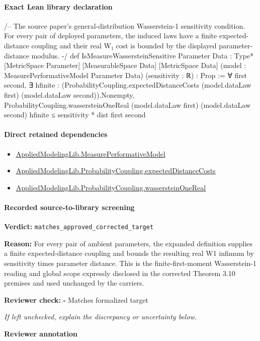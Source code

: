\documentclass[10pt]{article}
\newcommand{\reviewerbox}{%
  \par\noindent\fbox{\parbox{0.96\linewidth}{\rule{0pt}{0.38in}}}\par
}
\newcommand{\reviewmatch}[1]{%
  \par\noindent\textbf{Reviewer check:} $\square$\; #1\par
  \noindent\emph{If left unchecked, explain the discrepancy or uncertainty below.}\par
}
\begin{document}
\paragraph{Exact Lean library declaration}
\begin{ReviewVerbatim}
/--
The source paper's general-distribution Wasserstein-1 sensitivity condition.
For every pair of deployed parameters, the induced laws have a finite
expected-distance coupling and their real W₁ cost is bounded by the displayed
parameter-distance modulus.
-/
def IsMeasureWassersteinSensitive {Parameter Data : Type*}
    [MetricSpace Parameter] [MeasurableSpace Data] [MetricSpace Data]
    (model : MeasurePerformativeModel Parameter Data) (sensitivity : ℝ) : Prop :=
  ∀ first second,
    ∃ hfinite : (ProbabilityCoupling.expectedDistanceCosts
      (model.dataLaw first) (model.dataLaw second)).Nonempty,
      ProbabilityCoupling.wassersteinOneReal (model.dataLaw first) (model.dataLaw second) hfinite ≤
        sensitivity * dist first second
\end{ReviewVerbatim}

\paragraph{Direct retained dependencies}
\begin{itemize}\raggedright
\item \hyperlink{library-prerequisite-96553d4fbb82f1ac}{Applied\allowbreak{}Modeling\allowbreak{}Lib.\allowbreak{}Measure\allowbreak{}Performative\allowbreak{}Model}
\item \hyperlink{governing-declaration-0507d24247d6815a}{Applied\allowbreak{}Modeling\allowbreak{}Lib.\allowbreak{}Probability\allowbreak{}Coupling.\allowbreak{}expected\allowbreak{}Distance\allowbreak{}Costs}
\item \hyperlink{governing-declaration-7fdf7bcf28dbe52b}{Applied\allowbreak{}Modeling\allowbreak{}Lib.\allowbreak{}Probability\allowbreak{}Coupling.\allowbreak{}wasserstein\allowbreak{}One\allowbreak{}Real}
\end{itemize}
\paragraph{Recorded source-to-library screening}
\textbf{Verdict:} \texttt{matches\_approved\_corrected\_target}
\\
{\raggedright
\textbf{Reason:} For every pair of ambient parameters, the expanded definition supplies a finite expected-\allowbreak{}distance coupling and bounds the resulting real W1 infimum by sensitivity times parameter distance.\allowbreak{} This is the finite-\allowbreak{}first-\allowbreak{}moment Wasserstein-\allowbreak{}1 reading and global scope expressly disclosed in the corrected Theorem 3.\allowbreak{}10 premises and used unchanged by the carriers.\allowbreak{}
\par}
\reviewmatch{Matches formalized target}
\noindent\textbf{Reviewer annotation}\par
\reviewerbox
\clearpage
\hypertarget{library-prerequisite-e14cc5e8b1e1460e}{}
\end{document}
